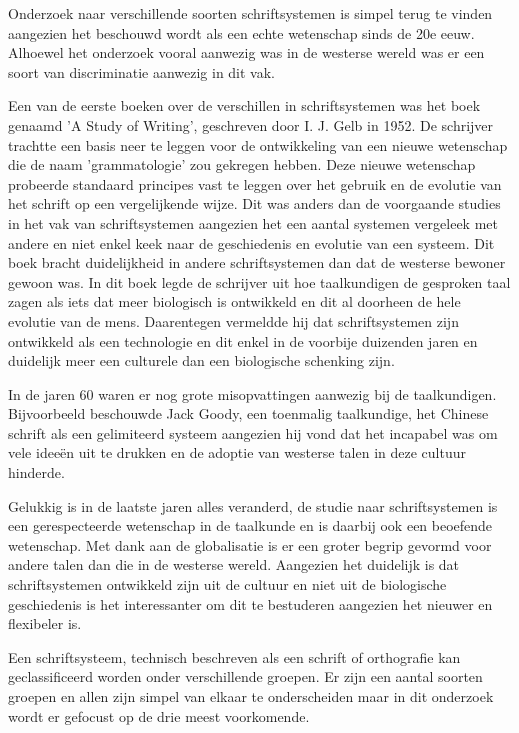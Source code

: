 Onderzoek naar verschillende soorten schriftsystemen is simpel terug te vinden aangezien het beschouwd wordt als een echte wetenschap sinds de 20e eeuw.
Alhoewel het onderzoek vooral aanwezig was in de westerse wereld was er een soort van discriminatie aanwezig in dit vak.

Een van de eerste boeken over de verschillen in schriftsystemen was het boek genaamd 'A Study of Writing', geschreven door I. J. Gelb in 1952. \autocite{Gelb1952}
De schrijver trachtte een basis neer te leggen voor de ontwikkeling van een nieuwe wetenschap die de naam 'grammatologie' zou gekregen hebben.
Deze nieuwe wetenschap probeerde standaard principes vast te leggen over het gebruik en de evolutie van het schrift op een vergelijkende wijze.
Dit was anders dan de voorgaande studies in het vak van schriftsystemen aangezien het een aantal systemen vergeleek met andere en niet enkel keek naar de geschiedenis en evolutie van een systeem.
Dit boek bracht duidelijkheid in andere schriftsystemen dan dat de westerse bewoner gewoon was. 
In dit boek legde de schrijver uit hoe taalkundigen de gesproken taal zagen als iets dat meer biologisch is ontwikkeld en dit al doorheen de hele evolutie van de mens.
Daarentegen vermeldde hij dat schriftsystemen zijn ontwikkeld als een technologie en dit enkel in de voorbije duizenden jaren en duidelijk meer een culturele dan een biologische schenking zijn.

In de jaren 60 waren er nog grote misopvattingen aanwezig bij de taalkundigen.
Bijvoorbeeld beschouwde Jack Goody, een toenmalig taalkundige, het Chinese schrift als een gelimiteerd systeem aangezien hij vond dat het incapabel was om vele ideeën uit te drukken en de adoptie van westerse talen in deze cultuur hinderde.

Gelukkig is in de laatste jaren alles veranderd, de studie naar schriftsystemen is een gerespecteerde wetenschap in de taalkunde en is daarbij ook een beoefende wetenschap. 
Met dank aan de globalisatie is er een groter begrip gevormd voor andere talen dan die in de westerse wereld.
Aangezien het duidelijk is dat schriftsystemen ontwikkeld zijn uit de cultuur en niet uit de biologische geschiedenis is het interessanter om dit te bestuderen aangezien het nieuwer en flexibeler is.

Een schriftsysteem, technisch beschreven als een schrift of orthografie kan geclassificeerd worden onder verschillende groepen. \autocite{David} \autocite{Allan2015}
Er zijn een aantal soorten groepen en allen zijn simpel van elkaar te onderscheiden maar in dit onderzoek wordt er gefocust op de drie meest voorkomende.

